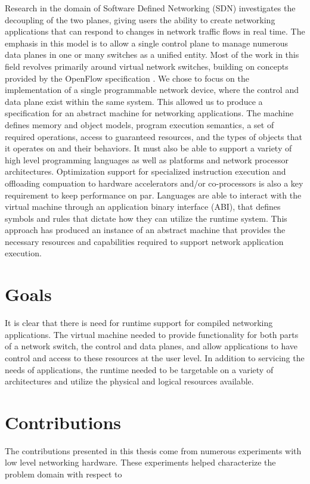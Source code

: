 Research in the domain of Software Defined Networking (SDN) investigates the
decoupling of the two planes, giving users the ability to create networking
applications that can respond to changes in network traffic flows in real time.
The emphasis in this model is to allow a single control plane to manage numerous
data planes in one or many switches as a unified entity. Most of the work in
this field revolves primarily around virtual network switches, building on
concepts provided by the OpenFlow specification \cite{openflow}. We chose to
focus on the implementation of a single programmable network device, where the
control and data plane exist within the same system. This allowed us to produce
a specification for an abstract machine for networking applications.
The machine defines memory and object models, program execution semantics,
a set of required operations, access to guaranteed resources, and the types
of objects that it operates on and their behaviors. It must also be able to
support a variety of high level programming languages as well as platforms
and network processor architectures. Optimization support for specialized
instruction execution and offloading compuation to hardware accelerators and/or
co-processors is also a key requirement to keep performance on par. Languages
are able to interact with the virtual machine through an application binary
interface (ABI), that defines symbols and rules that dictate how they can
utilize the runtime system. This approach has produced an instance of an
abstract machine that provides the necessary resources and capabilities
required to support network application execution.


\section{Goals}
\label{intro:goals}
It is clear that there is need for runtime support for compiled
networking applications. The virtual machine needed to provide functionality
for both parts of a network switch, the control and data planes, and allow
applications to have control and access to these resources at the user level.
In addition to servicing the needs of applications, the runtime needed to be
targetable on a variety of architectures and utilize the physical and logical
resources available.

\section{Contributions}
\label{intro:contrib}
The contributions presented in this thesis come from numerous experiments with
low level networking hardware. These experiments helped characterize the problem
domain with respect to 

